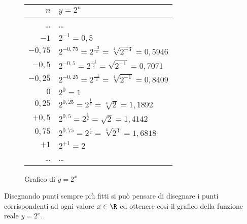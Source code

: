 \begin{figure}[h]
 \centering
 \begin{minipage}[]{.48\textwidth}
  \begin{center}
  \renewcommand\arraystretch{1.3}
   \begin{tabular}{r|l}
    \(n\)   & \(y=2^n\) \\
    \hline
    \dots & \dots \\
    \(-1\) & \(2^{-1} = 0,5\) \\
    \(-0,75\) & \(2^{-0,75} = 2^{\frac{-3}{4}} = \sqrt[4]{2^{-3}} = 
0,5946\) \\
    \(-0,5\) & \(2^{-0,5} = 2^{\frac{-1}{2}} = \sqrt{2^{-1}} = 0,7071\) \\
    \(-0,25\) & \(2^{-0,25} = 2^{\frac{-1}{4}} = \sqrt[4]{2^{-1}} = 
0,8409\) \\
    \(0\) & \(2^{0} = 1\) \\
    \(0,25\) & \(2^{0,25} = 2^{\frac{1}{4}} = \sqrt[4]{2} = 1,1892\) \\
    \(+0,5\) & \(2^{0,5} = 2^{\frac{1}{2}} = \sqrt{2} = 1,4142\) \\
    \(0,75\) & \(2^{0,75} = 2^{\frac{3}{4}} = \sqrt[4]{2^3} = 1,6818\) \\
    \(+1\) & \(2^{+1} = 2\) \\
    \dots & \dots \\
   \end{tabular}
  \end{center}
 \end{minipage}
\begin{minipage}[]{.48\textwidth}
\begin{center}
\begin{inaccessibleblock}
  \vspace*{.8cm}
  \puntib
  \vspace*{.65cm}
  \caption{Grafico di \(y=2^x\)} \label{fig:potdue1}
\end{inaccessibleblock}
\end{center}
\end{minipage}
\end{figure}

Disegnando punti sempre più fitti si può pensare di disegnare i punti 
corrispondenti ad ogni valore \(x \in \R\) ed ottenere così il grafico 
della 
funzione reale \(y=2^x\).


